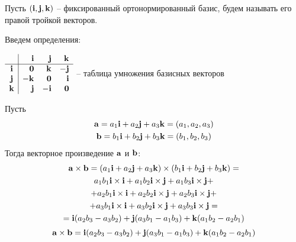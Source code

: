 \documentclass[main]{subfiles}
\begin{document}
\begin{definition}
    Пусть $(\mathbf{i}, \mathbf{j}, \mathbf{k})$ -- фиксированный ортонормированный базис,
    будем называть его правой тройкой векторов.

    Введем определения:
    \begin{center}
        $\begin{array}{c|rrr}
                    & \mathbf{i}  & \mathbf{j}  & \mathbf{k}  \\ \hline
                \mathbf{i} & \mathbf{0}  & \mathbf{k}  & -\mathbf{j} \\
                \mathbf{j} & -\mathbf{k} & \mathbf{0}  & \mathbf{i}  \\
                \mathbf{k} & \mathbf{j}  & -\mathbf{i} & \mathbf{0}
            \end{array}$
        -- таблица умножения базисных векторов
    \end{center}

    Пусть
    \begin{gather*}
        \mathbf{a} = a_1 \mathbf{i} + a_2 \mathbf{j} + a_3 \mathbf{k} = (a_1, a_2, a_3)\\
        \mathbf{b} = b_1 \mathbf{i} + b_2 \mathbf{j} + b_3 \mathbf{k} = (b_1, b_2, b_3)
    \end{gather*}
    Тогда векторное произведение $\mathbf{a}$ и $\mathbf{b}$:
    \begin{multline*}
        \mathbf{a} \times \mathbf{b} =
        (a_1 \mathbf{i} + a_2 \mathbf{j} + a_3 \mathbf{k}) \times (b_1 \mathbf{i} + b_2 \mathbf{j} + b_3 \mathbf{k})=\\
        a_1 b_1 \mathbf{i} \times \mathbf{i} + a_1 b_2 \mathbf{i} \times \mathbf{j} + a_1 b_3 \mathbf{i} \times \mathbf{j}+\\
        +a_2 b_1 \mathbf{i} \times \mathbf{i} + a_2 b_2 \mathbf{i} \times \mathbf{j} + a_2 b_3 \mathbf{i} \times \mathbf{j}+\\
        +a_3 b_1 \mathbf{i} \times \mathbf{i} + a_3 b_2 \mathbf{i} \times \mathbf{j} + a_3 b_3 \mathbf{i} \times \mathbf{j}=\\
        = \mathbf{i} (a_2 b_3 - a_3 b_2)+ \mathbf{j} (a_3 b_1 - a_1 b_3) + \mathbf{k} (a_1 b_2 - a_2 b_1)
    \end{multline*}
    \[\mathbf{a} \times \mathbf{b} = \mathbf{i} (a_2 b_3 - a_3 b_2)+ \mathbf{j} (a_3 b_1 - a_1 b_3) + \mathbf{k} (a_1 b_2 - a_2 b_1)\]
\end{definition}
\end{document}
